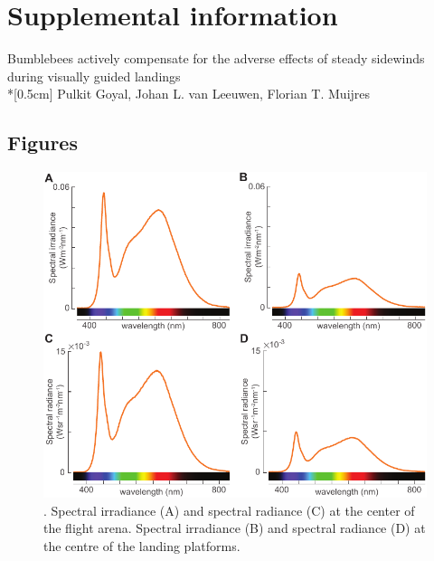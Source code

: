 \chapter*{Supplemental information}
\renewcommand{\thesection}{S\arabic{section}}
\renewcommand{\thesubsection}{S\arabic{section}.\arabic{subsection}}
\renewcommand{\thesubsubsection}{S\arabic{section}.\arabic{subsection}.\arabic{subsubsection}}
\renewcommand{\theequation}{S\arabic{equation}}
\renewcommand{\thefigure}{S\arabic{figure}}
\renewcommand{\thetable}{S\arabic{table}}
\setcounter{section}{0}
\setcounter{subsection}{0}
\setcounter{equation}{0}
\setcounter{figure}{0}
\setcounter{table}{0}

\vspace*{3cm}
{\huge Bumblebees actively compensate for the adverse effects of steady sidewinds during visually guided landings}
\\*[0.5cm]
{\large Pulkit Goyal, Johan L. van Leeuwen, Florian T. Muijres}
\clearpage

\section{Figures}
\label{section_sw_s_figures}

\begin{figure}[H]
	\centering
	\includegraphics{figures/chapter4/figure_sw_s_lightintensity}
	\caption{. Spectral irradiance (A) and spectral radiance (C) at the center of the flight arena. Spectral irradiance (B) and spectral radiance (D) at the centre of the landing platforms.}
	\label{figure_sw_s_lightintensity}
\end{figure}

